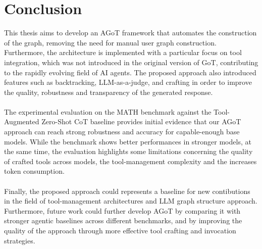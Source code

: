 \documentclass[12pt,a4paper,openright,twoside]{book}
\begin{document}
\chapter{Conclusion}
\label{chap:conclusion}
This thesis aims to develop an \ac{AGoT} framework that automates the construction of the graph, removing the need for manual user graph construction.
Furthermore, the architecture is implemented with a particular focus on tool integration, which was not introduced in the original version of \ac{GoT}, contributing to the rapidly evolving field of AI agents.
The proposed approach also introduced features such as backtracking, LLM-as-a-judge, and crafting in order to improve the quality, robustness and transparency of the generated response.
\\\\
The experimental evaluation on the MATH benchmark against the Tool-Augmented Zero-Shot \ac{CoT} baseline provides initial evidence 
that our \ac{AGoT} approach can reach strong robustness and accuracy for capable-enough base models.
While the benchmark shows better performances in stronger models, at the same time, the evaluation highlights some limitations concerning the quality of crafted tools across models, the tool-management complexity and the increases token consumption.
\\\\
Finally, the proposed approach could represents a baseline for new contibutions in the field of tool-management architectures and \ac{LLM} graph structure approach. 
Furthermore, future work could further develop \ac{AGoT} by comparing it with stronger agentic baselines across different benchmarks, and by improving the quality of the approach through more effective tool crafting and invocation strategies.



\end{document}
